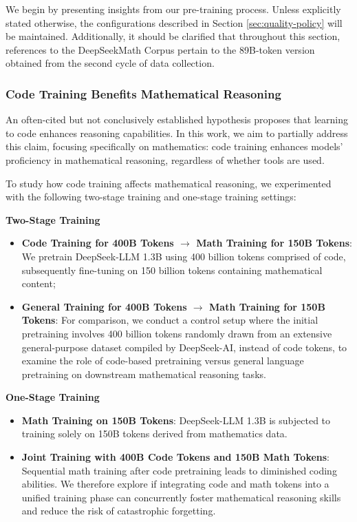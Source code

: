 \begin{itemize}[topsep=0pt]
\begin{itemize}[topsep=0pt]
We begin by presenting insights from our pre-training process. Unless explicitly stated otherwise, the configurations described in Section \ref{sec:quality-policy} will be maintained. Additionally, it should be clarified that throughout this section, references to the DeepSeekMath Corpus pertain to the 89B-token version obtained from the second cycle of data collection.

\subsubsection{Code Training Benefits Mathematical Reasoning}

An often-cited but not conclusively established hypothesis proposes that learning to code enhances reasoning capabilities. In this work, we aim to partially address this claim, focusing specifically on mathematics: code training enhances models' proficiency in mathematical reasoning, regardless of whether tools are used.

To study how code training affects mathematical reasoning, we experimented with the following two-stage training and one-stage training settings:

\textbf{Two-Stage Training}

\begin{itemize}[topsep=0pt]
    \item \textbf{Code Training for 400B Tokens $\rightarrow$ Math Training for 150B Tokens}: We pretrain DeepSeek-LLM 1.3B using 400 billion tokens comprised of code, subsequently fine-tuning on 150 billion tokens containing mathematical content;
    \item \textbf{General Training for 400B Tokens $\rightarrow$ Math Training for 150B Tokens}: For comparison, we conduct a control setup where the initial pretraining involves 400 billion tokens randomly drawn from an extensive general-purpose dataset compiled by DeepSeek-AI, instead of code tokens, to examine the role of code-based pretraining versus general language pretraining on downstream mathematical reasoning tasks.
\end{itemize}

\textbf{One-Stage Training}

\begin{itemize}[topsep=0pt]
    \item \textbf{Math Training on 150B Tokens}: DeepSeek-LLM 1.3B is subjected to training solely on 150B tokens derived from mathematics data.
    \item \textbf{Joint Training with 400B Code Tokens and 150B Math Tokens}: Sequential math training after code pretraining leads to diminished coding abilities. We therefore explore if integrating code and math tokens into a unified training phase can concurrently foster mathematical reasoning skills and reduce the risk of catastrophic forgetting.
\end{itemize}


\end{itemize}
\end{itemize}
